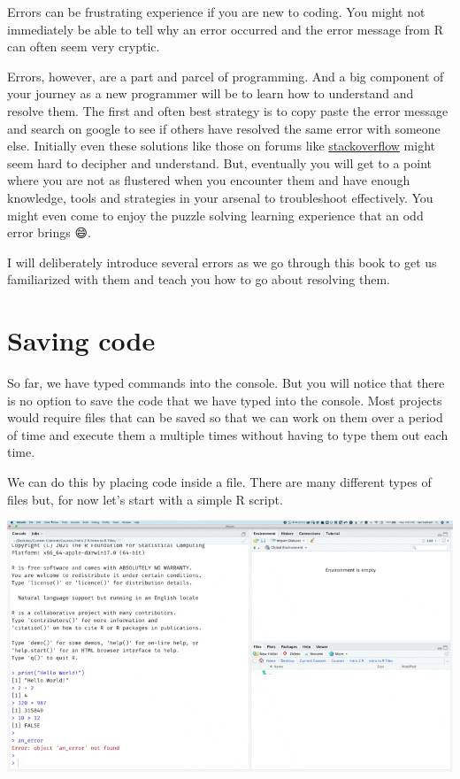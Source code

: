 \documentclass[
]{book}
\begin{document}
Errors can be frustrating experience if you are new to coding. You might not immediately be able to tell why an error occurred and the error message from R can often seem very cryptic.

Errors, however, are a part and parcel of programming. And a big component of your journey as a new programmer will be to learn how to understand and resolve them. The first and often best strategy is to copy paste the error message and search on google to see if others have resolved the same error with someone else. Initially even these solutions like those on forums like \href{https://stackoverflow.com/questions/14469486/r-issue-object-not-found}{stackoverflow} might seem hard to decipher and understand. But, eventually you will get to a point where you are not as flustered when you encounter them and have enough knowledge, tools and strategies in your arsenal to troubleshoot effectively. You might even come to enjoy the puzzle solving learning experience that an odd error brings 😄.

I will deliberately introduce several errors as we go through this book to get us familiarized with them and teach you how to go about resolving them.

\hypertarget{saving-code}{%
\section{Saving code}\label{saving-code}}

So far, we have typed commands into the console. But you will notice that there is no option to save the code that we have typed into the console. Most projects would require files that can be saved so that we can work on them over a period of time and execute them a multiple times without having to type them out each time.

We can do this by placing code inside a file. There are many different types of files but, for now let's start with a simple R script.

\includegraphics{assets/ch_1-setup/gifs/new_file.gif}
\end{document}
